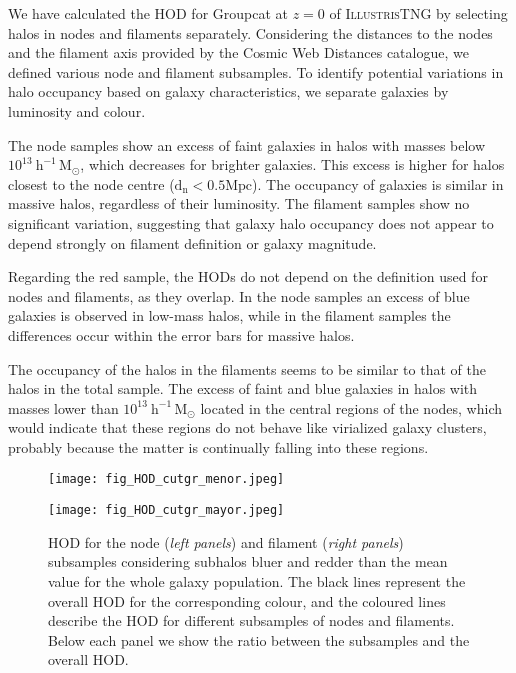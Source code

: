 \documentclass[baaa]{baaa}
\begin{document}
We have calculated the HOD for Groupcat at $z=0$ of \textsc{IllustrisTNG} by selecting halos in nodes and filaments separately.
Considering the distances to the nodes and the filament axis provided by the Cosmic Web Distances catalogue, we defined various node and filament subsamples.
To identify potential variations in halo occupancy based on galaxy characteristics, we separate galaxies by luminosity and colour.

The node samples show an excess of faint galaxies in halos with masses below $10^{13}~\mathrm{h^{-1}\,M}_{\odot}$, which decreases for brighter galaxies. 
This excess is higher for halos closest to the node centre ($\mathrm{d_n} < 0.5 \mathrm{Mpc}$).
The occupancy of galaxies is similar in massive halos, regardless of their luminosity.
The filament samples show no significant variation, suggesting that galaxy halo occupancy does not appear to depend strongly on filament definition or galaxy magnitude.

Regarding the red sample, the HODs do not depend on the definition used for nodes and filaments, as they overlap.
In the node samples an excess of blue galaxies is observed in low-mass halos, while in the filament samples the differences occur within the error bars for massive halos.

The occupancy of the halos in the filaments seems to be similar to that of the halos in the total sample.
The excess of faint and blue galaxies in halos with masses lower than $10^{13}~\mathrm{h^{-1}\,M}_{\odot}$ located in the central regions of the nodes, which would indicate that these regions do not behave like virialized galaxy clusters, probably because the matter is continually falling into these regions.







\begin{figure*}[!h]
\centering
    \texttt{[image: fig\_HOD\_cutgr\_menor.jpeg]}

    \texttt{[image: fig\_HOD\_cutgr\_mayor.jpeg]}
\caption{HOD for the node (\emph{left panels}) and filament (\emph{right panels}) subsamples considering subhalos bluer and redder than the mean value for the whole galaxy population. The black lines represent the overall HOD for the corresponding colour, and the coloured lines describe the HOD for different subsamples of nodes and filaments. Below each panel we show the ratio between the subsamples and the overall HOD.}
\label{Fig:hod_col}
\end{figure*}
\end{document}
